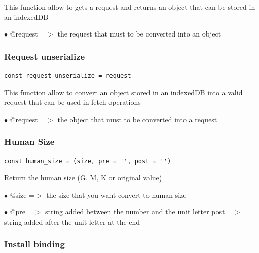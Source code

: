 \documentclass[a4paper]{article}
\begin{document}
This function allow to gets a request and returns an object
that can be stored in an indexedDB

\begin{compactitem}
\item[\color{myblue}$\bullet$] @request =$>$ the request that must to be converted into an object
\end{compactitem}

\hypertarget{toc272}{}
\subsubsection{Request unserialize}

\begin{lstlisting}
const request_unserialize = request
\end{lstlisting}

This function allow to convert an object stored in an indexedDB
into a valid request that can be used in fetch operations

\begin{compactitem}
\item[\color{myblue}$\bullet$] @request =$>$ the object that must to be converted into a request
\end{compactitem}

\hypertarget{toc273}{}
\subsubsection{Human Size}

\begin{lstlisting}
const human_size = (size, pre = '', post = '')
\end{lstlisting}

Return the human size (G, M, K or original value)

\begin{compactitem}
\item[\color{myblue}$\bullet$] @size  =$>$ the size that you want convert to human size
\item[\color{myblue}$\bullet$] @pre  =$>$ string added between the number and the unit letter
post  =$>$ string added after the unit letter at the end
\end{compactitem}

\hypertarget{toc274}{}
\subsubsection{Install binding}
\end{document}
